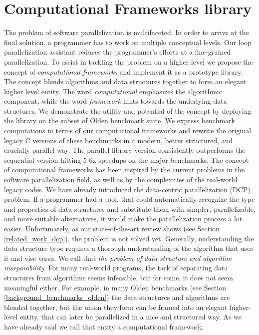 \section{Computational Frameworks library}
\label{introduction_frameworks}
\quad The problem of software parallelization is multifaceted. In order to arrive at the final solution, a programmer has to work on multiple conceptual levels. Our loop parallelization assistant reduces the programmer's efforts at a fine-grained parallelization. To assist in tackling the problem on a higher level we propose the concept of \textit{computational frameworks} and implement it as a prototype library. The concept blends algorithms and data structures together to form an elegant higher level entity. The word \textit{computational} emphasizes the algorithmic component, while the word \textit{framework} hints towards the underlying data structures. We demonstrate the utility and potential of the concept by deploying the library on the subset of Olden benchmark suite. We express benchmark computations in terms of our computational frameworks and rewrite the original legacy C versions of these benchmarks in a modern, better structured, and crucially parallel way. The parallel library version consistently outperforms the sequential version hitting 5-6x speedups on the major benchmarks.\newline\null
\quad The concept of computational frameworks has been inspired by the current problems in the software parallelization field, as well as by the complexities of the real-world legacy codes. We have already introduced the data-centric parallelization (DCP) problem. If a programmer had a tool, that could automatically recognize the type and properties of data structures and substitute them with simpler, parallelizable, and more suitable alternatives, it would make the parallelization process a lot easier. Unfortunately, as our state-of-the-art review shows (see Section \ref{related_work_dcp}), the problem is not solved yet.\newline\null
\quad Generally, understanding the data structure type requires a thorough understanding of the algorithm that uses it and vise versa. We call that \textit{the problem of data structure and algorithm inseparability}. For many real-world programs, the task of separating data structures from algorithms seems infeasible, but for some, it does not seem meaningful either. For example, in many Olden benchmarks (see Section \ref{background_benchmarks_olden}) the data structures and algorithms are blended together, but the union they form can be framed into an elegant higher-level entity, that can later be parallelized in a nice and structured way. As we have already said we call that entity a computational framework.\newline\null
